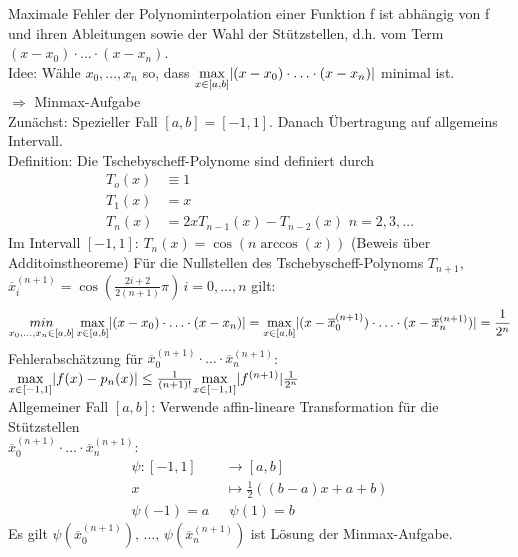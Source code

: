Maximale Fehler der Polynominterpolation einer Funktion f ist abhängig von f und ihren
Ableitungen sowie der Wahl der Stützstellen, d.h. vom Term
$(x - x_0)\cdot \ldots \cdot(x - x_n)$. \\
Idee: Wähle $x_0, \ldots, x_n$ so, dass $\underset{x \in [a, b]}{\max} |(x - x_0)\cdot \ldots \cdot(x - x_n)|$
minimal ist. \\
$\Rightarrow$ Minmax-Aufgabe \\
Zunächst: Spezieller Fall $[a, b] = [-1, 1]$. Danach Übertragung auf allgemeins
Intervall. \\
Definition: Die Tschebyscheff-Polynome sind definiert durch
\begin{align*}
  T_o(x) &\equiv 1\\
  T_1(x) &= x\\
  T_n(x) &= 2xT_{n-1}(x) - T_{n-2}(x)\,\, n = 2, 3, \ldots
\end{align*}
Im Intervall $[-1, 1]:\,T_n(x) = \cos(n\arccos(x))$ (Beweis über Additoinstheoreme)
 Für die Nullstellen des Tschebyscheff-Polynoms $T_{n+1}$, 
$\overline{x}_i^{(n+1)} = \cos(\frac{2i + 2}{2(n + 1)}\pi)\, i = 0, \ldots, n$ gilt:
\begin{align*}
  \underset{x_0, \ldots, x_n \in [a, b]}{min} \, \underset{x \in [a, b]}{\max} |(x - x_0)
    \cdot \ldots \cdot(x - x_n)| = 
    \underset{x \in [a, b]}{\max} |(x - \overline{x}_0^{(n + 1)})\cdot \ldots 
    \cdot(x - \overline{x}_n^{(n + 1)})| =\frac{1}{2^n}
\end{align*}
Fehlerabschätzung für 
$\overline{x}_0^{(n + 1)}\cdot \ldots \cdot\overline{x}_n^{(n + 1)}$: 
$\underset{x \in [-1, 1]}{\max}|f(x) - p_n(x)| \leq \frac{1}{(n + 1)!} \underset{x \in [-1, 1]}{\max} |f^{(n + 1)}| \frac{1}{2^n}$ \\
Allgemeiner Fall $[a, b]$: Verwende affin-lineare Transformation für die Stützstellen \\
$\overline{x}_0^{(n + 1)}\cdot \ldots \cdot\overline{x}_n^{(n + 1)}$:
\begin{align*}
  \psi: [-1, 1] &\longrightarrow [a, b] \\
  x &\longmapsto \frac{1}{2}((b - a)x + a + b) \\
  \psi(-1) = a\,\,&\,\, \psi(1) = b
\end{align*}
Es gilt $\psi(\overline{x}_0^{(n + 1)}),\,\ldots,\,\psi(\overline{x}_n^{(n + 1)})$ ist
Lösung der Minmax-Aufgabe.

